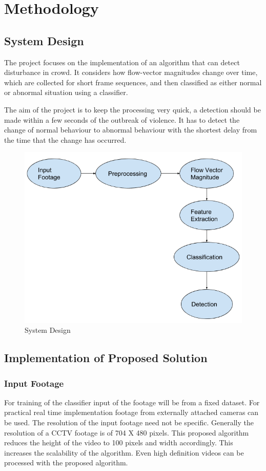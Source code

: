 \chapter{Methodology}
\section{System Design}
The project focuses on the implementation of an algorithm that can detect disturbance in crowd. It considers how flow-vector magnitudes change over time, which are collected for short frame sequences, and then classified as either normal or abnormal situation using a classifier.
\par
The aim of the project is to keep the processing very quick, a detection should be made within a few seconds of the outbreak of violence. It has to detect the change of normal behaviour to abnormal behaviour with the shortest delay from the time that the change has occurred.

\begin{figure}[H]
\centering
\includegraphics[scale = 0.4]{system_design.png}
\caption{System Design}
\end{figure}

\section{Implementation of Proposed Solution}
\subsection{Input Footage}
For training of the classifier input of the footage will be from a fixed dataset. For practical real time implementation footage from externally attached cameras can be used. The resolution of the input footage need not be specific. Generally the resolution of a CCTV footage is of 704 X 480 pixels. This proposed algorithm reduces the height of the video to 100 pixels and width accordingly. This increases the scalability of the algorithm. Even high definition videos can be processed with the proposed algorithm.
